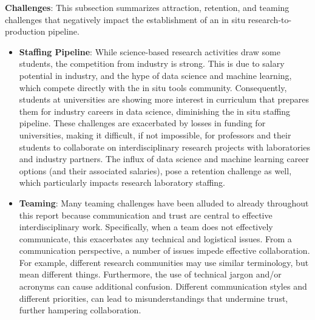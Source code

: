 \textbf{Challenges}: 
This subsection summarizes attraction, retention, and teaming challenges that negatively impact the establishment of an in situ research-to-production pipeline.
\begin{itemize}
    \item \textbf{Staffing Pipeline}: While science-based research activities draw some students, the competition from industry is strong.  This is due to salary potential in industry, and the hype of data science and machine learning, which compete directly with the in situ tools community.  Consequently, students at universities are showing more interest in curriculum that prepares them for industry careers in data science, diminishing the in situ staffing pipeline. These challenges are exacerbated by losses in funding for universities, making it difficult, if not impossible, for professors and their students to collaborate on interdisciplinary research projects with laboratories and industry partners.  The influx of data science and machine learning career options (and their associated salaries), pose a retention challenge as well, which particularly impacts  research laboratory staffing.
    \item \textbf{Teaming}: Many teaming challenges have been alluded to already throughout this report because communication and trust are central to effective interdisciplinary work. Specifically, when a team does not effectively communicate, this exacerbates any technical and logistical issues.  From a communication perspective, a number of issues impede effective collaboration.  For example, different research communities may use similar terminology, but mean different things.  Furthermore, the use of technical jargon and/or acronyms can cause additional confusion. Different communication styles and different priorities,  can lead to misunderstandings that undermine trust, further hampering collaboration.
\end{itemize}

